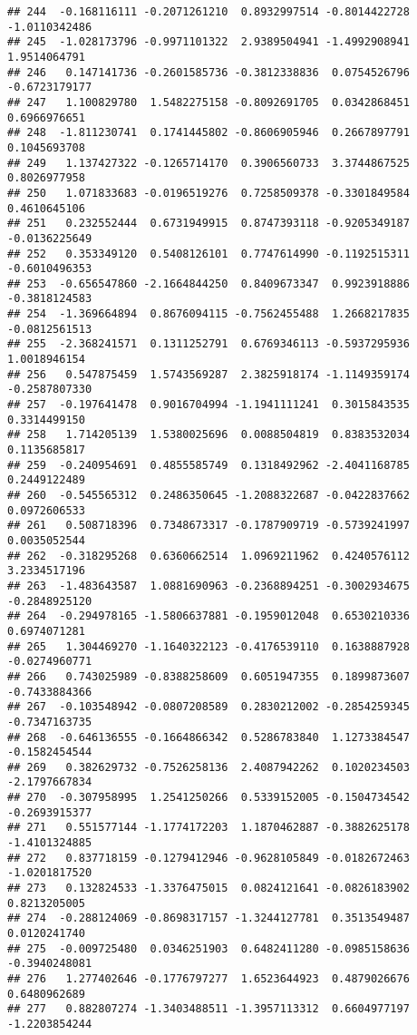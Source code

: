 \documentclass[
]{article}
\begin{document}
\begin{verbatim}
## 244  -0.168116111 -0.2071261210  0.8932997514 -0.8014422728 -1.0110342486
## 245  -1.028173796 -0.9971101322  2.9389504941 -1.4992908941  1.9514064791
## 246   0.147141736 -0.2601585736 -0.3812338836  0.0754526796 -0.6723179177
## 247   1.100829780  1.5482275158 -0.8092691705  0.0342868451  0.6966976651
## 248  -1.811230741  0.1741445802 -0.8606905946  0.2667897791  0.1045693708
## 249   1.137427322 -0.1265714170  0.3906560733  3.3744867525  0.8026977958
## 250   1.071833683 -0.0196519276  0.7258509378 -0.3301849584  0.4610645106
## 251   0.232552444  0.6731949915  0.8747393118 -0.9205349187 -0.0136225649
## 252   0.353349120  0.5408126101  0.7747614990 -0.1192515311 -0.6010496353
## 253  -0.656547860 -2.1664844250  0.8409673347  0.9923918886 -0.3818124583
## 254  -1.369664894  0.8676094115 -0.7562455488  1.2668217835 -0.0812561513
## 255  -2.368241571  0.1311252791  0.6769346113 -0.5937295936  1.0018946154
## 256   0.547875459  1.5743569287  2.3825918174 -1.1149359174 -0.2587807330
## 257  -0.197641478  0.9016704994 -1.1941111241  0.3015843535  0.3314499150
## 258   1.714205139  1.5380025696  0.0088504819  0.8383532034  0.1135685817
## 259  -0.240954691  0.4855585749  0.1318492962 -2.4041168785  0.2449122489
## 260  -0.545565312  0.2486350645 -1.2088322687 -0.0422837662  0.0972606533
## 261   0.508718396  0.7348673317 -0.1787909719 -0.5739241997  0.0035052544
## 262  -0.318295268  0.6360662514  1.0969211962  0.4240576112  3.2334517196
## 263  -1.483643587  1.0881690963 -0.2368894251 -0.3002934675 -0.2848925120
## 264  -0.294978165 -1.5806637881 -0.1959012048  0.6530210336  0.6974071281
## 265   1.304469270 -1.1640322123 -0.4176539110  0.1638887928 -0.0274960771
## 266   0.743025989 -0.8388258609  0.6051947355  0.1899873607 -0.7433884366
## 267  -0.103548942 -0.0807208589  0.2830212002 -0.2854259345 -0.7347163735
## 268  -0.646136555 -0.1664866342  0.5286783840  1.1273384547 -0.1582454544
## 269   0.382629732 -0.7526258136  2.4087942262  0.1020234503 -2.1797667834
## 270  -0.307958995  1.2541250266  0.5339152005 -0.1504734542 -0.2693915377
## 271   0.551577144 -1.1774172203  1.1870462887 -0.3882625178 -1.4101324885
## 272   0.837718159 -0.1279412946 -0.9628105849 -0.0182672463 -1.0201817520
## 273   0.132824533 -1.3376475015  0.0824121641 -0.0826183902  0.8213205005
## 274  -0.288124069 -0.8698317157 -1.3244127781  0.3513549487  0.0120241740
## 275  -0.009725480  0.0346251903  0.6482411280 -0.0985158636 -0.3940248081
## 276   1.277402646 -0.1776797277  1.6523644923  0.4879026676  0.6480962689
## 277   0.882807274 -1.3403488511 -1.3957113312  0.6604977197 -1.2203854244

\end{verbatim}
\end{document}

